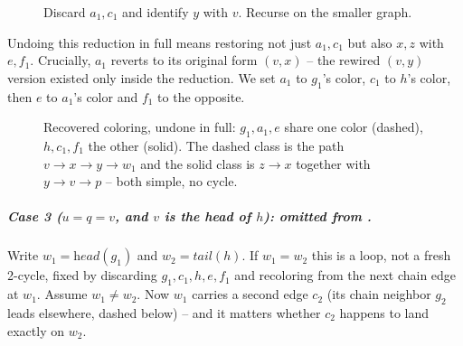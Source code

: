 \begin{figure}[H]
\centering
{}
\caption{Discard $a_1,c_1$ and identify $y$ with $v$. Recurse on the smaller
graph.}
\end{figure}
Undoing this reduction in full means restoring not just $a_1,c_1$ but also $x,z$
with $e,f_1$. Crucially, $a_1$ reverts to its original form $(v,x)$ -- the
rewired $(v,y)$ version existed only inside the reduction. We set $a_1$ to
$g_1$'s color, $c_1$ to $h$'s color, then $e$ to $a_1$'s color and $f_1$ to the
opposite.
\begin{figure}[H]
\centering
{}
\caption{Recovered coloring, undone in full: $g_1,a_1,e$ share one color
(dashed), $h,c_1,f_1$ the other (solid). The dashed class is the path $v\to x\to
y\to w_1$ and the solid class is $z\to x$ together with $y\to v\to p$ -- both
simple, no cycle.}
\end{figure}

\subparagraph{Case 3 ($u=q=v$, and $v$ is the head of $h$): omitted from
\cite{Blaser2004}.}
Write $w_1=\textit{head}(g_1)$ and $w_2=\textit{tail}(h)$. If $w_1=w_2$ this is
a loop, not a fresh 2-cycle, fixed by discarding $g_1,c_1,h,e,f_1$ and
recoloring from the next chain edge at $w_1$. Assume $w_1 \ne w_2$. Now $w_1$
carries a second edge $c_2$ (its chain neighbor $g_2$ leads elsewhere, dashed
below) -- and it matters whether $c_2$ happens to land exactly on $w_2$.

